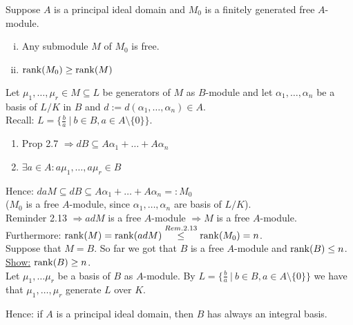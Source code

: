 \begin{remin}
Suppose $A$ is a principal ideal domain and $M_0$ is a finitely generated free $A$-module.
\begin{enumerate}[i)]
\item Any submodule $M$ of $M_0$ is free.
\item $\operatorname{rank}(M_0) \geq \operatorname{rank}(M)$
\end{enumerate}
\end{remin}

\begin{Bew}[of Prop 2.12]
Let $\mu_1, \dots, \mu_r \in M \subseteq L$ be generators of $M$ as $B$-module and let $\alpha_1, \dots, \alpha_n$ be a basis of $L/K$ in $B$ and $d:=d(\alpha_1, \dots, \alpha_n) \in A$.\\
Recall: $L = \{ \frac{b}{a} \ | \ b \in B, a \in A \setminus \{0\}\}$.
\begin{enumerate}[(1)]
\item Prop 2.7 $\Rightarrow dB \subseteq A \alpha_1 + \dots + A \alpha_n$
\item $\exists a \in A: a \mu_1, \dots, a \mu_r \in B$
\end{enumerate}
Hence: $daM \subseteq dB \subseteq A \alpha_1 + \dots + A \alpha_n =: M_0 $\\
($M_0$ is a free $A$-module, since $\alpha_1, \dots, \alpha_n$ are basis of $L/K$).\\
Reminder 2.13 $\Rightarrow adM$ is a free $A$-module $\Rightarrow M$ is a free $A$-module.\\ Furthermore: $\operatorname{rank}(M)= \operatorname{rank} (adM) \stackrel{Rem. 2.13}{\leq } \operatorname{rank} (M_0) = n$.\\
Suppose that $M = B$. So far we got that $B$ is a free $A$-module and $\operatorname{rank}(B) \leq n$.\\
\underline{Show:} $\operatorname{rank}(B) \geq n$.\\
Let $\mu_1, \dots \mu_r$ be a basis of $B$ as $A$-module. By $L=\{\frac{b}{a} \ | \ b \in B, a \in A \setminus \{0\}\}$ we have that $\mu_1, \dots, \mu_r$ generate $L$ over $K$.
\end{Bew}

Hence: if $A$ is a principal ideal domain, then $B$ has always an integral basis.

